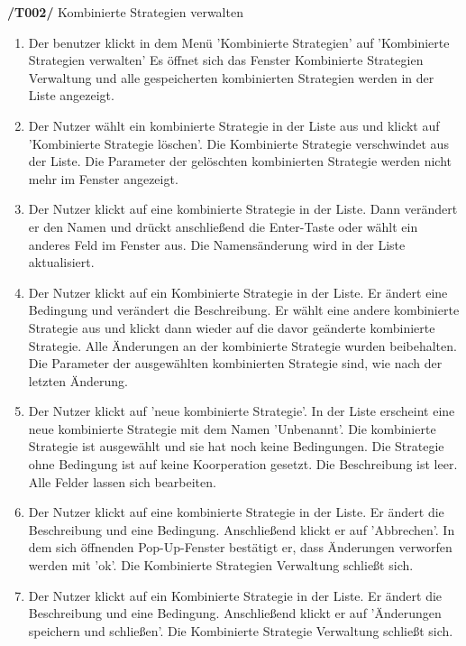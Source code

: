 \textbf{/T002/} Kombinierte Strategien verwalten
\begin{enumerate}
\item {}
{Der benutzer klickt in dem Menü 'Kombinierte Strategien' auf 'Kombinierte Strategien verwalten'}
{Es öffnet sich das Fenster Kombinierte Strategien Verwaltung und alle gespeicherten kombinierten Strategien werden in der Liste angezeigt.}

\item {}
{Der Nutzer wählt ein kombinierte Strategie in der Liste aus und klickt auf 'Kombinierte Strategie löschen'.}
{Die Kombinierte Strategie verschwindet aus der Liste. Die Parameter der gelöschten kombinierten Strategie werden nicht mehr im Fenster angezeigt.}

\item {}
{Der Nutzer klickt auf eine kombinierte Strategie in der Liste. Dann verändert er den Namen und drückt anschließend die Enter-Taste oder wählt ein anderes Feld im Fenster aus.}
{Die Namensänderung wird in der Liste aktualisiert. }

\item {}
{Der Nutzer klickt auf ein Kombinierte Strategie in der Liste. Er ändert eine Bedingung und verändert die Beschreibung. Er wählt eine andere kombinierte Strategie aus und klickt dann wieder auf die davor geänderte kombinierte Strategie.}
{Alle Änderungen an der kombinierte Strategie wurden beibehalten. Die Parameter der ausgewählten kombinierten Strategie sind, wie nach der letzten Änderung.}

\item {}
{Der Nutzer klickt auf 'neue kombinierte Strategie'.}
{In der Liste erscheint eine neue kombinierte Strategie mit dem Namen 'Unbenannt'. Die kombinierte Strategie ist ausgewählt und sie hat noch keine Bedingungen. Die Strategie ohne Bedingung ist auf keine Koorperation gesetzt. Die Beschreibung ist leer. Alle Felder lassen sich bearbeiten.}

\item {}
{Der Nutzer klickt auf eine kombinierte Strategie in der Liste. Er ändert die Beschreibung und eine Bedingung. Anschließend klickt er auf 'Abbrechen'. In dem sich öffnenden Pop-Up-Fenster bestätigt er, dass Änderungen verworfen werden mit 'ok'.}
{Die Kombinierte Strategien Verwaltung schließt sich.}

\item {}
{Der Nutzer klickt auf ein Kombinierte Strategie in der Liste. Er ändert die Beschreibung und eine Bedingung. Anschließend klickt er auf 'Änderungen speichern und schließen'.}
{Die Kombinierte Strategie Verwaltung schließt sich.}


\end{enumerate}

